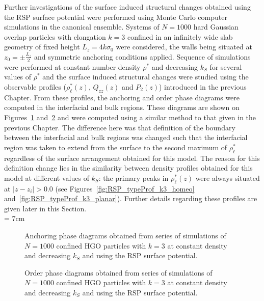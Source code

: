 Further investigations of the
surface induced structural changes obtained using the RSP surface potential were performed using
Monte Carlo computer simulations in the canonical ensemble. Systems of $N=1000$ hard Gaussian overlap
particles with elongation $k=3$ confined in an infinitely wide slab geometry of fixed height 
$L_z=4k\sigma_0$ were considered, the walls being situated at $z_0 = \pm\frac{L_z}{2}$ and
symmetric anchoring conditions applied. Sequence of
simulations were performed at constant number density $\rho^{*}$ and decreasing 
$k_S$ for several values of $\rho^{*}$ and the surface induced structural changes were studied 
using the observable 
profiles ($\rho^{*}_\ell(z)$, $Q_{zz}(z)$ and $P_2(z)$) introduced in the previous Chapter. 
From these profiles, the anchoring and order phase diagrams were computed in the 
interfacial and bulk regions. These diagrams are shown on Figures~\ref{fig:RSP_QzzWa} 
and~\ref{fig:RSP_P2Wa} and were computed using a similar method to that given in the previous
Chapter. The difference here was that
definition of the boundary between the interfacial and bulk regions was changed
such that the interfacial region was taken to extend from the surface to the second 
maximum of $\rho^{*}_\ell$
regardless of the surface arrangement obtained for this model. The reason for this definition 
change lies in the similarity
between density profiles obtained for this model at different values of $k_S$:
the primary peaks in $\rho^{*}_\ell(z)$ were always situated at $|z-z_i|> 0.0$ 
(see \eg Figures~\ref{fig:RSP_typeProf_k3_homeo} and~\ref{fig:RSP_typeProf_k3_planar}). 
Further details regarding these profiles are given later in this Section.\\

\picW = 7cm
\begin{figure}
	\centering
	\caption{Anchoring phase diagrams obtained from series of simulations of $N=1000$
	confined HGO particles with $k=3$ at constant density and decreasing $k_S$ 
	and using the RSP surface potential.}
	\label{fig:RSP_QzzWa}
\end{figure}

\begin{figure}
	\centering
	\caption{Order phase diagrams obtained from series of simulations of $N=1000$
	confined HGO particles with $k=3$ at constant density and decreasing $k_S$ 
	and using the RSP surface potential.}
	\label{fig:RSP_P2Wa}
\end{figure}


